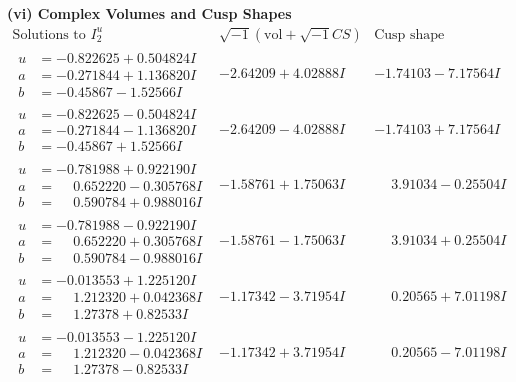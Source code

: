 \documentclass[1p]{elsarticle_modified}
\theoremstyle{definition}
\newcommand{\I}{\sqrt{-1}}
\begin{document}
\newpage\flushleft \textbf{(vi) Complex Volumes and Cusp Shapes}
$$\begin{array}{c|c|c}  
\text{Solutions to }I^u_{2}& \I (\text{vol} + \sqrt{-1}CS) & \text{Cusp shape}\\
 \hline 
\begin{aligned}
u &= -0.822625 + 0.504824 I \\
a &= -0.271844 + 1.136820 I \\
b &= -0.45867 - 1.52566 I\end{aligned}
 & -2.64209 + 4.02888 I & -1.74103 - 7.17564 I \\ \hline\begin{aligned}
u &= -0.822625 - 0.504824 I \\
a &= -0.271844 - 1.136820 I \\
b &= -0.45867 + 1.52566 I\end{aligned}
 & -2.64209 - 4.02888 I & -1.74103 + 7.17564 I \\ \hline\begin{aligned}
u &= -0.781988 + 0.922190 I \\
a &= \phantom{-}0.652220 - 0.305768 I \\
b &= \phantom{-}0.590784 + 0.988016 I\end{aligned}
 & -1.58761 + 1.75063 I & \phantom{-}3.91034 - 0.25504 I \\ \hline\begin{aligned}
u &= -0.781988 - 0.922190 I \\
a &= \phantom{-}0.652220 + 0.305768 I \\
b &= \phantom{-}0.590784 - 0.988016 I\end{aligned}
 & -1.58761 - 1.75063 I & \phantom{-}3.91034 + 0.25504 I \\ \hline\begin{aligned}
u &= -0.013553 + 1.225120 I \\
a &= \phantom{-}1.212320 + 0.042368 I \\
b &= \phantom{-}1.27378 + 0.82533 I\end{aligned}
 & -1.17342 - 3.71954 I & \phantom{-}0.20565 + 7.01198 I \\ \hline\begin{aligned}
u &= -0.013553 - 1.225120 I \\
a &= \phantom{-}1.212320 - 0.042368 I \\
b &= \phantom{-}1.27378 - 0.82533 I\end{aligned}
 & -1.17342 + 3.71954 I & \phantom{-}0.20565 - 7.01198 I \\ \hline\begin{aligned}

\end{aligned}
\end{array}$$
\end{document}
